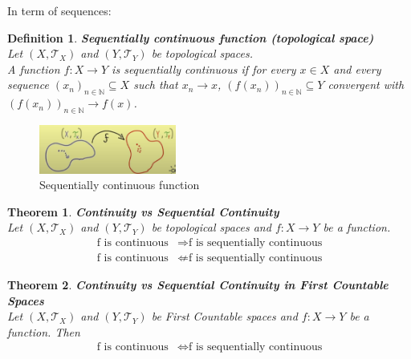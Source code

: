 \documentclass[11pt]{book} %
\newtheorem{theorem}{Theorem}[section]
\newtheorem{definition}{Definition}[section]
\begin{document}
In term of sequences:

\begin{definition}{\textbf{Sequentially continuous function (topological space)}} \\
    Let \( (X, \mathcal{T}_X) \) and \( (Y, \mathcal{T}_Y) \) be topological spaces. \\
    A function \( f: X \to Y \) is sequentially continuous if for every \( x \in X \) and every sequence 
    \( (x_n)_{n \in \mathbb{N}} \subseteq X \) such that \( x_n \to x \), \( (f(x_n))_{n \in \mathbb{N}} \subseteq Y \) convergent 
    with \( (f(x_n))_{n \in \mathbb{N}} \to f(x) \).
\end{definition}

\begin{figure}[H]
    \centering
    \includegraphics[width=0.4\textwidth]{Figs/sequentially_continues_function.png}
    \caption{Sequentially continuous function}
\end{figure}

\begin{theorem}{\textbf{Continuity vs Sequential Continuity}} \\
    Let \( (X, \mathcal{T}_X) \) and \( (Y, \mathcal{T}_Y) \) be topological spaces and \( f: X \to Y \) be a function. \\
    \begin{align*}
        \text{f is continuous} &\Rightarrow \text{f is sequentially continuous} \\
        \text{f is continuous} &\nLeftarrow \text{f is sequentially continuous}
    \end{align*}
\end{theorem}

\begin{theorem}{\textbf{Continuity vs Sequential Continuity in First Countable Spaces}} \\
    Let \( (X, \mathcal{T}_X) \) and \( (Y, \mathcal{T}_Y) \) be First Countable spaces and \( f: X \to Y \) be a function. Then 
    \begin{align*}
        \text{f is continuous} &\Leftrightarrow \text{f is sequentially continuous}
    \end{align*}
\end{theorem}
\end{document}
